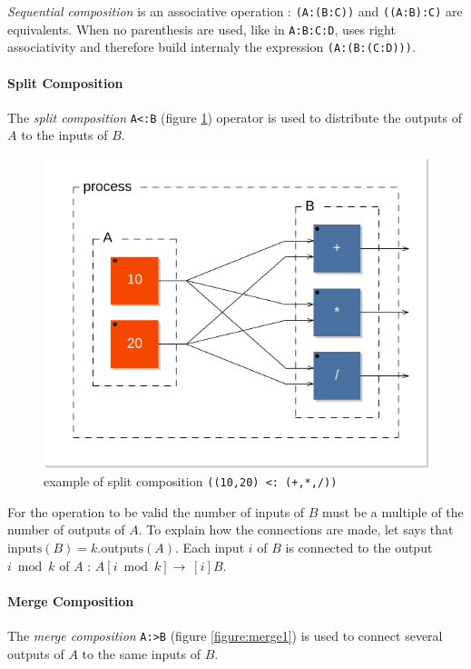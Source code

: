 \documentclass[a4paper,10pt]{book}
\begin{document}
\emph{Sequential composition} is an associative operation : \lstinline$(A:(B:C))$ and \lstinline$((A:B):C)$ are equivalents. When no parenthesis are used, like in \lstinline$A:B:C:D$, \faust uses right associativity and therefore build internaly the expression \lstinline$(A:(B:(C:D)))$.

\paragraph{Split Composition}
The \emph{split composition}  \lstinline$A<:B$ (figure \ref{figure:split1}) operator is used to distribute the outputs
of $A$ to the inputs of $B$.

\begin{figure}[h]
\centering 
\includegraphics[scale=0.7]{images/split1} 
\caption{example of split composition   \lstinline'((10,20) <: (+,*,/))'}  
\label{figure:split1}
\end{figure}

For the operation to be valid the number of inputs of $B$ must be a multiple of the number of outputs of $A$. To explain how the connections are made, let says that $\mathrm{inputs}(B) = k.\mathrm{outputs}(A)$. Each input $i$ of $B$ is connected to the output $i \bmod k$ of $A$ : $A[i \bmod k]\rightarrow\ [i]B$.


\paragraph{Merge Composition}
The \emph{merge composition}  \lstinline$A:>B$ (figure \ref{figure:merge1}) is used to connect several outputs
of  $A$ to the same inputs of $B$. 
\end{document}
